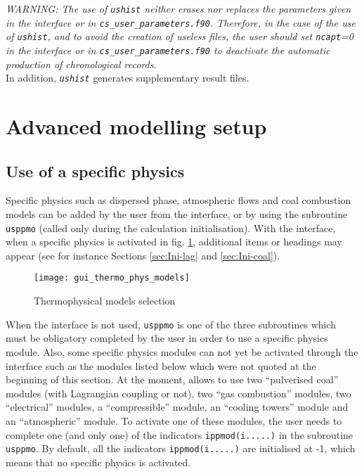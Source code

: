{{{\begin{list}{-}{}
\end{list}

{\em WARNING: The use of {\em\texttt{ushist}} neither erases nor replaces the
parameters given in the interface or in {\em\texttt{cs\_user\_parameters.f90}}. Therefore, in
the case of the use of {\em\texttt{ushist}}, and to avoid the creation
of useless files, the user should set {\em \texttt{ncapt}=0} in the interface or
in {\em \texttt{cs\_user\_parameters.f90}} to deactivate the automatic production of
chronological records}.\\
In addition, {\em \texttt{ushist}} generates supplementary result
files.


\section{Advanced modelling setup}

\subsection{Use of a specific physics}
\label{prg_usppmo}%
Specific physics such as dispersed phase, atmospheric flows and coal combustion models can be added by the user from the interface, or by using the subroutine \texttt{usppmo} (called only during the calculation initialisation). With the interface, when a specific physics is activated in fig. \ref{fig:5_GUI}, additional items or headings may appear (see for instance Sections \ref{sec:Ini-lag} and \ref{sec:Ini-coal}).

\begin{figure}[!ht]
\begin{center}
\texttt{[image: gui\_thermo\_phys\_models]}
\caption{Thermophysical models selection}
\label{fig:5_GUI}
\end{center}
\end{figure}

When the interface is not used, \texttt{usppmo} is one of the three subroutines which must be obligatory completed by the user in order to use a specific physics module. Also, some specific physics modules can not yet be activated through the interface such as the modules listed below which were not quoted at the beginning of this section.
At the moment, \CS allows to use two ``pulverised coal'' modules
(with Lagrangian coupling or not), two ``gas combustion'' modules, two
``electrical'' modules, a ``compressible'' module, an ``cooling towers'' module and an ``atmospheric'' module. To activate one of
these modules, the user needs to complete one (and only one) of the
indicators \texttt{ippmod(i.....)} in the subroutine
\texttt{usppmo}. By default, all the indicators \texttt{ippmod(i.....)} are
initialised at -1, which means that no specific physics is activated.

}}}
